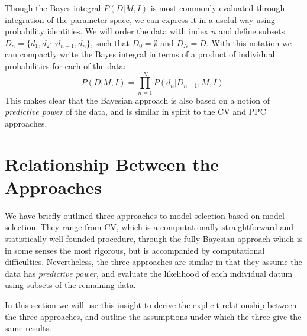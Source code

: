 \documentclass[12pt]{article}
\begin{document}
Though the Bayes integral $P(D|M,I)$ is most commonly evaluated through
integration of the parameter space, we can express it in a useful way
using probability identities.  We will order the data with index $n$ and
define subsets $D_{n} = \{d_1, d_2 \cdots d_{n-1}, d_n\}$, such that
$D_0 = \emptyset$ and $D_N = D$.
With this notation we can compactly write the Bayes integral
in terms of a product of individual probabilities for each of the data:
\begin{equation}
  \label{eq:bayes_chain}
  P(D|M,I) = \prod_{n=1}^N P(d_n|D_{n-1},M,I).
\end{equation}
This makes clear that the Bayesian approach is also based on a notion of
{\it predictive power} of the data, and is similar in spirit to
the CV and PPC approaches.

\section{Relationship Between the Approaches}
We have briefly outlined three approaches to model selection based on model
selection.  They range from CV, which is a computationally straightforward
and statistically well-founded procedure, through the fully Bayesian approach
which is in some senses the most rigorous, but is accompanied by
computational difficulties.  Nevertheless, the three approaches are similar
in that they assume the data has {\it predictive power}, and evaluate
the likelihood of each individual datum using subsets of the remaining data.

In this section we will use this insight to
derive the explicit relationship between the three
approaches, and outline the assumptions under which the three give the same
results.
\end{document}
